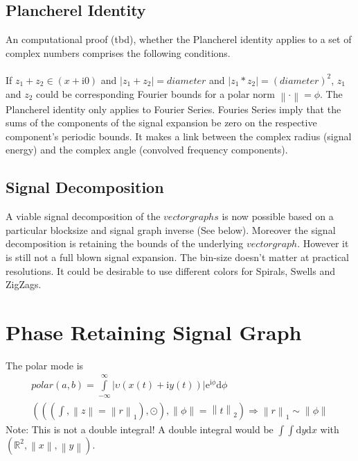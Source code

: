 \documentclass{report}
\newcommand\norm[1]{\left\lVert#1\right\rVert}
\begin{document}
\subsection{Plancherel Identity}
An computational proof (tbd), whether the Plancherel identity applies to a set of complex numbers comprises the following conditions.\\\\
If $z_{1}+z_{2}\in (x+\mathrm{i}0)$ and $\lvert z_{1}+z_{2}\rvert=diameter$ and $\lvert z_{1}*z_{2}\rvert=(diameter)^2$, $z_{1}$ and $z_{2}$ could be corresponding Fourier bounds for a polar norm $\norm{\cdot}=\phi$.
The Plancherel identity only applies to Fourier Series. Fouries Series imply that the sums of the components of the signal expansion be zero on the respective component's periodic bounds. It makes a link between the complex radius (signal energy) and the complex angle (convolved frequency components).
\subsection{Signal Decomposition}
A viable signal decomposition of the $vectorgraphs$ is now possible based on a particular blocksize and signal graph inverse (See below). Moreover the signal decomposition is retaining the bounds of the underlying $vectorgraph$. However it is still not a full blown signal expansion. The bin-size doesn't matter at practical resolutions. It could be desirable to use different colors for Spirals, Swells and ZigZags.

\section{Phase Retaining Signal Graph}
The polar mode is
\begin{align}
polar(a,b)=\int \limits _{-\infty}^{\infty} \lvert \upsilon (x(t)+\mathrm{i}y(t))\rvert \mathrm{e}^{\mathrm{i}\phi} \mathrm{d}\phi\\
(((\int,\norm{z}=\norm{r}_1),\odot),\norm{\phi}= \norm{t}_2)\Rightarrow \norm{r}_1 \sim \norm{\phi}
\end{align}
Note: This is not a double integral! A double integral would be $\int \int \mathrm{d}y\mathrm{d}x$ with $(\mathbb{R}^2,\norm{x},\norm{y})$.
\end{document}
